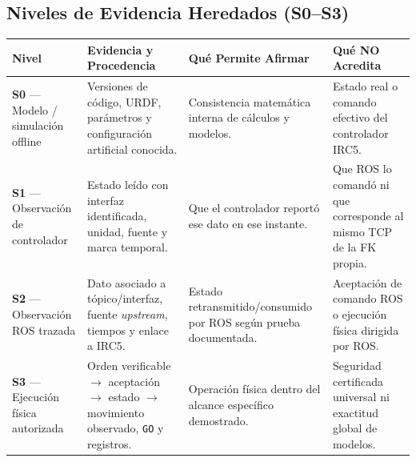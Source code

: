 \documentclass[10pt, a4paper]{article}
\begin{document}
\begin{center}
\end{center}

\subsection{Niveles de Evidencia Heredados (S0–S3)}
\begin{center}
\scriptsize
\setlength{\tabcolsep}{4pt}
\renewcommand{\arraystretch}{1.28}
\begin{tabularx}{\textwidth}{|>{\hsize=0.65\hsize\raggedright\arraybackslash}X|>{\hsize=1.05\hsize\raggedright\arraybackslash}X|>{\hsize=1.15\hsize\raggedright\arraybackslash}X|>{\hsize=1.15\hsize\raggedright\arraybackslash}X|}
\hline
\rowcolor{ucbblue!15}
\textbf{Nivel} & \textbf{Evidencia y Procedencia} & \textbf{Qué Permite Afirmar} & \textbf{Qué NO Acredita} \\ \hline
\textbf{S0} — Modelo / simulación offline & Versiones de código, URDF, parámetros y configuración artificial conocida. & Consistencia matemática interna de cálculos y modelos. & Estado real o comando efectivo del controlador IRC5. \\ \hline
\textbf{S1} — Observación de controlador & Estado leído con interfaz identificada, unidad, fuente y marca temporal. & Que el controlador reportó ese dato en ese instante. & Que ROS lo comandó ni que corresponde al mismo TCP de la FK propia. \\ \hline
\textbf{S2} — Observación ROS trazada & Dato asociado a tópico/interfaz, fuente \textit{upstream}, tiempos y enlace a IRC5. & Estado retransmitido/consumido por ROS según prueba documentada. & Aceptación de comando ROS o ejecución física dirigida por ROS. \\ \hline
\textbf{S3} — Ejecución física autorizada & Orden verificable $\to$ aceptación $\to$ estado $\to$ movimiento observado, \texttt{GO} y registros. & Operación física dentro del alcance específico demostrado. & Seguridad certificada universal ni exactitud global de modelos. \\ \hline
\end{tabularx}
\end{center}
\end{document}
